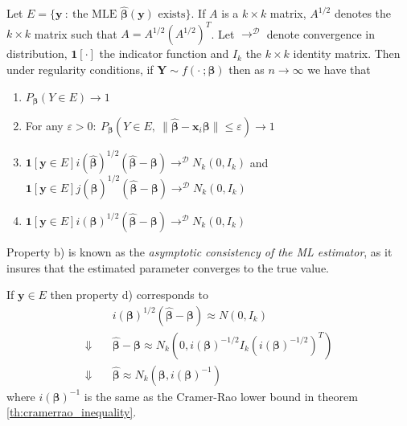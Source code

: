 \begin{theorem}\label{th:distribution_ml_estimator}
Let $E = \{\mathbf{y} \ : \ \text{the MLE } \hat{\boldsymbol{\beta}}(\mathbf{y}) \text{ exists}\}$. 
If $A$ is a $k \times k$ matrix, $A^{1/2}$ denotes the $k \times k$ matrix such that $A = A^{1/2}\left( A^{1/2} \right)^T$.
Let $\rightarrow^\mathcal{D}$ denote convergence in distribution, $\mathbf{1}[\cdot]$ the indicator function and $I_k$ the $k \times k$ identity matrix.
Then under regularity conditions, if $\mathbf{Y} \sim f(\cdot \ ;\boldsymbol{\beta})$ then as $n \rightarrow \infty$ we have that
\begin{enumerate}[label=(\alph*)]
    \item $P_{\boldsymbol{\beta}}(Y \in E) \rightarrow 1$
    \item For any $\varepsilon > 0: \ P_{\boldsymbol{\beta}}(Y \in E, \ \|\hat{\boldsymbol{\beta}} - \textbf{x}_i\boldsymbol{\beta}\| \leq \varepsilon) \rightarrow 1$
    \item $\mathbf{1}[\mathbf{y} \in E] i(\hat{\boldsymbol{\beta}})^{1/2}(\hat{\boldsymbol{\beta}} - \boldsymbol{\beta}) \rightarrow^\mathcal{D} N_k(0, I_k)$ and $\textbf{1}[\mathbf{y} \in E] j(\hat{\boldsymbol{\beta}})^{1/2}(\hat{\boldsymbol{\beta}} - \boldsymbol{\beta}) \rightarrow^\mathcal{D} N_k(0, I_k)$
    \item $\textbf{1}[\mathbf{y} \in E] i(\boldsymbol{\beta})^{1/2}(\hat{\boldsymbol{\beta}} - \boldsymbol{\beta}) \rightarrow^\mathcal{D} N_k(0, I_k)$
\end{enumerate}
\end{theorem}

Property b) is known as the \textit{asymptotic consistency of the ML estimator}, as it insures that the estimated parameter converges to the true value.

If $\textbf{y}\in E$ then property d) corresponds to
\begin{align*}
    & i(\boldsymbol{\beta})^{1/2} (\hat{\boldsymbol{\beta}}-\boldsymbol{\beta}) \approx N(0,I_k) \\
    \Downarrow \quad & \hat{\boldsymbol{\beta}}-\boldsymbol{\beta} \approx N_k(0,i(\boldsymbol{\beta})^{-1/2} I_k (i(\boldsymbol{\beta})^{-1/2})^T) \\
    \Downarrow \quad & \hat{\boldsymbol{\beta}} \approx N_k(\boldsymbol{\beta}, i(\boldsymbol{\beta})^{-1})
\end{align*}
where $i(\boldsymbol{\beta})^{-1}$ is the same as the Cramer-Rao lower bound in theorem \ref{th:cramerrao_inequality}.

